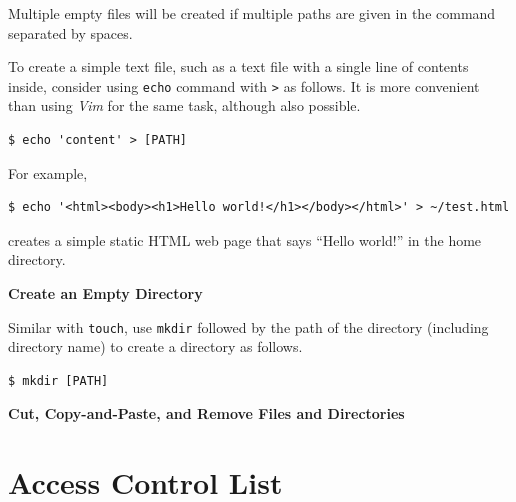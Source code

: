 Multiple empty files will be created if multiple paths are given in the command separated by spaces.

To create a simple text file, such as a text file with a single line of contents inside, consider using \verb|echo| command with \verb|>| as follows. It is more convenient than using \textit{Vim} for the same task, although also possible.
\begin{lstlisting}
$ echo 'content' > [PATH]
\end{lstlisting} 
For example,
\begin{lstlisting}
$ echo '<html><body><h1>Hello world!</h1></body></html>' > ~/test.html
\end{lstlisting}
creates a simple static HTML web page that says ``Hello world!'' in the home directory.

\textbf{Create an Empty Directory}

Similar with \verb|touch|, use \verb|mkdir| followed by the path of the directory (including directory name) to create a directory as follows.
\begin{lstlisting}
$ mkdir [PATH]
\end{lstlisting}

\textbf{Cut, Copy-and-Paste, and Remove Files and Directories}





\section{Access Control List}


